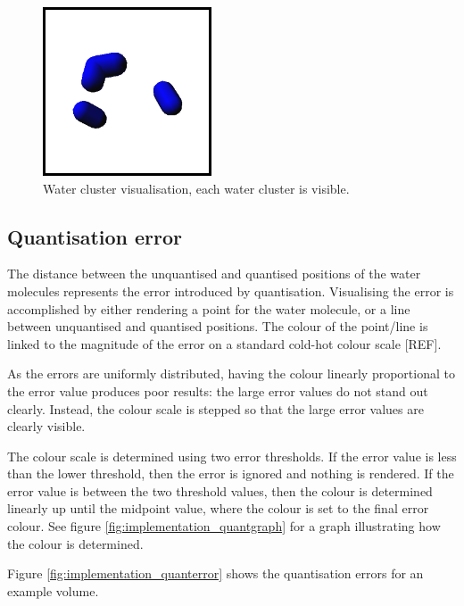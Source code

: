 \begin{figure}[h!]
  \begin{center}
    \includegraphics[width=50mm]{watercluster}
  \end{center}
  \caption{Water cluster visualisation, each water cluster is visible.}
  \label{fig:implementation_watercluster}
\end{figure}


\subsection{Quantisation error}
\label{sub:implementation_quantisation}

The distance between the unquantised and quantised positions of the water
molecules represents the error introduced by quantisation. Visualising the error is
accomplished by either rendering a point for the water molecule, or a line
between unquantised and quantised positions. The colour of the point/line is
linked to the magnitude of the error on a standard cold-hot colour scale [REF].

As the errors are uniformly distributed, having the colour linearly
proportional to the error value produces poor results: the large error values
do not stand out clearly. Instead, the colour scale is stepped so that the
large error values are clearly visible.

The colour scale is determined using two error thresholds. If the error value
is less than the lower threshold, then the error is ignored and nothing is
rendered. If the error value is between the two threshold values, then the
colour is determined linearly up until the midpoint value, where the colour is
set to the final error colour. See figure \ref{fig:implementation_quantgraph}
for a graph illustrating how the colour is determined.

Figure \ref{fig:implementation_quanterror} shows the quantisation errors for an
example volume.

